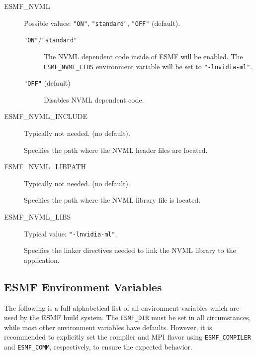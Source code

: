 \begin{description}

\item[ESMF\_NVML] Possible values: {\tt "ON"}, {\tt "standard"}, {\tt "OFF"} (default).

\begin{description}
\item[{\tt "ON"}/{\tt "standard"}] The NVML dependent code inside of ESMF will
be enabled.
The {\tt ESMF\_NVML\_LIBS} environment variable will be set to
{\tt "-lnvidia-ml"}.

\item[{\tt "OFF"} (default)] Disables NVML dependent code.
\end{description}

\item[ESMF\_NVML\_INCLUDE] Typically not needed. (no default).

Specifies the path where the NVML header files are located.

\item[ESMF\_NVML\_LIBPATH] Typically not needed. (no default).

Specifies the path where the NVML library file is located.

\item[ESMF\_NVML\_LIBS] Typical value: {\tt "-lnvidia-ml"}.

Specifies the linker directives needed to link the NVML library to
the application.

\end{description}

\subsection{ESMF Environment Variables}
\label{EnvironmentVariables}

The following is a full alphabetical list of all environment variables which
are used by the ESMF build system. The {\tt ESMF\_DIR} must be set in all
circumstances, while most other environment variables have defaults. However,
it is recommended to explicitly set the compiler and MPI flavor using
{\tt ESMF\_COMPILER} and {\tt ESMF\_COMM}, respectively, to ensure the expected
behavior.

